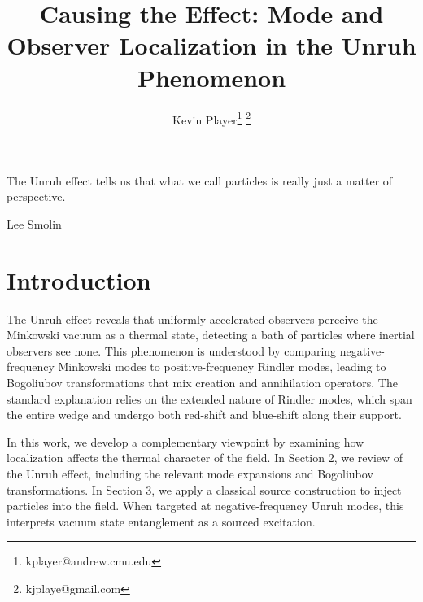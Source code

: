 \documentclass[12pt,a4paper]{article}
\begin{document}
\title{Causing the Effect: Mode and Observer Localization in the Unruh Phenomenon}
\author[1]{Kevin Player\footnote{kplayer@andrew.cmu.edu} \footnote{kjplaye@gmail.com}}

\maketitle

\epigraph{The Unruh effect tells us that what we call particles is really just a matter of perspective.}{Lee Smolin}



\section{Introduction}

The Unruh effect\cite{unruh1976notes} reveals that uniformly accelerated observers perceive the Minkowski vacuum as a thermal state, detecting a bath of particles where inertial observers see none. This phenomenon is understood by comparing negative-frequency Minkowski modes to positive-frequency Rindler modes, leading to Bogoliubov transformations that mix creation and annihilation operators\cite{crispino2008unruh}. The standard explanation relies on the extended nature of Rindler modes, which span the entire wedge and undergo both red-shift and blue-shift along their support.

In this work, we develop a complementary viewpoint by examining how localization affects the thermal character of the field. In Section 2, we review of the Unruh effect, including the relevant mode expansions and Bogoliubov transformations. In Section 3, we apply a classical source construction \cite{Schwinger_1966} to inject particles into the field. When targeted at negative-frequency Unruh modes, this interprets vacuum state entanglement as a sourced excitation.
\end{document}

